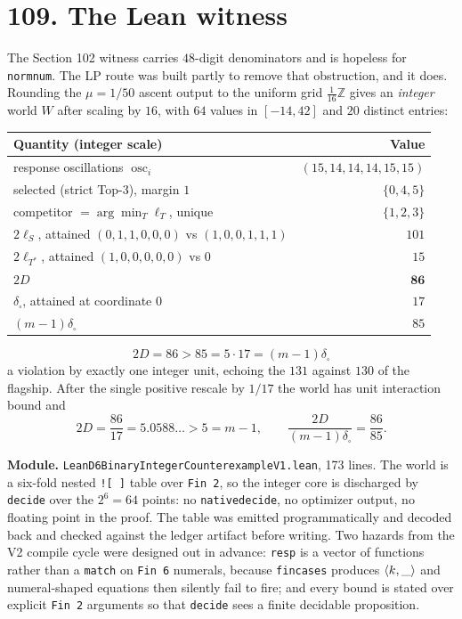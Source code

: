 \documentclass[9pt,twocolumn]{article}
\renewcommand{\_}{\CIGunderscore\allowbreak}
\begin{document}
\section*{109. The Lean witness}
The Section 102 witness carries $48$-digit denominators and is hopeless for \texttt{norm\_num}. The LP route was built partly to remove that obstruction, and it does. Rounding the $\mu=1/50$ ascent output to the uniform grid $\tfrac1{16}\mathbb{Z}$ gives an \emph{integer} world $W$ after scaling by $16$, with $64$ values in $[-14,42]$ and $20$ distinct entries:
\begin{center}\scriptsize
\begin{tabularx}{0.98\columnwidth}{Xr}
\toprule
Quantity (integer scale) & Value\\
\midrule
response oscillations $\operatorname{osc}_i$ & $(15,14,14,14,15,15)$\\
selected (strict Top-3), margin $1$ & $\{0,4,5\}$\\
competitor $=\arg\min_T\ell_T$, unique & $\{1,2,3\}$\\
$2\ell_S$, attained $(0,1,1,0,0,0)$ vs $(1,0,0,1,1,1)$ & $101$\\
$2\ell_{T^\ast}$, attained $(1,0,0,0,0,0)$ vs $0$ & $15$\\
$2D$ & $\mathbf{86}$\\
$\delta_{\square}$, attained at coordinate $0$ & $17$\\
$(m-1)\delta_{\square}$ & $85$\\
\bottomrule
\end{tabularx}
\end{center}
\[
\boxed{\,2D=86>85=5\cdot17=(m-1)\delta_{\square}\,}
\]
a violation by exactly one integer unit, echoing the $131$ against $130$ of the flagship. After the single positive rescale by $1/17$ the world has unit interaction bound and
\[
2D=\frac{86}{17}=5.0588\ldots>5=m-1,\qquad \frac{2D}{(m-1)\delta_\square}=\frac{86}{85}.
\]

\textbf{Module.} \texttt{LeanD6BinaryIntegerCounterexampleV1.lean}, 173 lines. The world is a six-fold nested \texttt{![\,]} table over \texttt{Fin 2}, so the integer core is discharged by \texttt{decide} over the $2^6=64$ points: no \texttt{native\_decide}, no optimizer output, no floating point in the proof. The table was emitted programmatically and decoded back and checked against the ledger artifact before writing. Two hazards from the V2 compile cycle were designed out in advance: \texttt{resp} is a vector of functions rather than a \texttt{match} on \texttt{Fin 6} numerals, because \texttt{fin\_cases} produces $\langle k,\_\rangle$ and numeral-shaped equations then silently fail to fire; and every bound is stated over explicit \texttt{Fin 2} arguments so that \texttt{decide} sees a finite decidable proposition.
\end{document}
